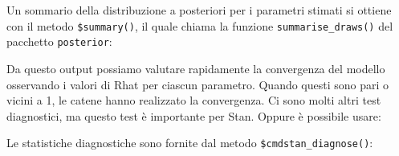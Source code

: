 \documentclass[
  11pt,
]{krantz}
\makeatletter
\newenvironment{Shaded}{\begin{snugshade}}{\end{snugshade}}
\newcommand{\CommentTok}[1]{\textcolor[rgb]{0.37,0.37,0.37}{\textit{#1}}}
\newcommand{\FunctionTok}[1]{\textcolor[rgb]{0,0,0}{#1}}
\newcommand{\NormalTok}[1]{#1}
\newcommand{\SpecialCharTok}[1]{\textcolor[rgb]{0,0,0}{#1}}
\newcommand{\StringTok}[1]{\textcolor[rgb]{0.5,0.5,0.5}{#1}}
\newenvironment{kframe}{%
\medskip{}
\setlength{\fboxsep}{.8em}
 \def\at@end@of@kframe{}%
 \ifinner\ifhmode%
  \def\at@end@of@kframe{\end{minipage}}%
  \begin{minipage}{\columnwidth}%
 \fi\fi%
 \def\FrameCommand##1{\hskip\@totalleftmargin \hskip-\fboxsep
 \colorbox{shadecolor}{##1}\hskip-\fboxsep
     \hskip-\linewidth \hskip-\@totalleftmargin \hskip\columnwidth}%
 \MakeFramed {\advance\hsize-\width
   \@totalleftmargin\z@ \linewidth\hsize
   \@setminipage}}%
 {\par\unskip\endMakeFramed%
 \at@end@of@kframe}
\renewenvironment{Shaded}{\begin{kframe}}{\end{kframe}}
\theoremstyle{definition}
\theoremstyle{definition}
\theoremstyle{definition}
\theoremstyle{definition}
\theoremstyle{remark}
\makeatother
\begin{document}
Un sommario della distribuzione a posteriori per i parametri stimati si ottiene con il metodo \texttt{\$summary()}, il quale chiama la funzione \texttt{summarise\_draws()} del pacchetto \texttt{posterior}:

\begin{Shaded}
\end{Shaded}

Da questo output possiamo valutare rapidamente la convergenza del modello osservando i valori di Rhat per ciascun parametro. Quando questi sono pari o vicini a 1, le catene hanno realizzato la convergenza. Ci sono molti altri test diagnostici, ma questo test è importante per Stan. Oppure è possibile usare:

\begin{Shaded}
\end{Shaded}

Le statistiche diagnostiche sono fornite dal metodo \texttt{\$cmdstan\_diagnose()}:

\begin{Shaded}
\end{Shaded}
\end{document}
